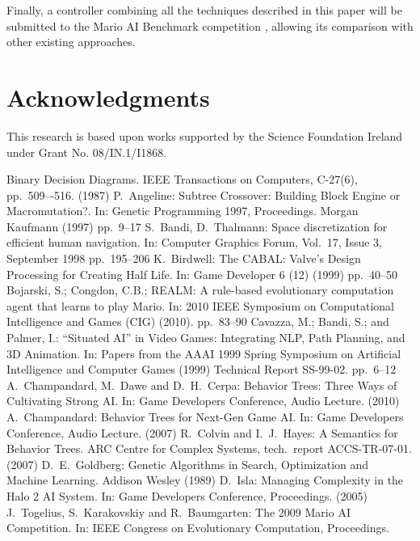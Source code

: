 \documentclass[conference]{IEEEtran}
\begin{document}
Finally, a controller combining all the techniques described in this paper will
be submitted to the Mario AI Benchmark competition \cite{JSR10}, allowing its
comparison with other existing approaches.

\section*{Acknowledgments}
This research is based upon works supported by the Science Foundation Ireland
under Grant No. 08/IN.1/I1868.


%
\begin{thebibliography}{11}
	Binary Decision Diagrams.
	IEEE Transactions on Computers, C-27(6), pp.~509–-516. (1987)
	P.~Angeline:
	Subtree Crossover: Building Block Engine or Macromutation?.
	In: Genetic Programming 1997, Proceedings.
	Morgan Kaufmann (1997)
	pp.~9--17
	S.~Bandi, D.~Thalmann:
	Space discretization for efficient human navigation.
	In: Computer Graphics Forum, Vol.~17, Issue 3, September 1998
	pp.~195--206
	K.~Birdwell:
	The CABAL: Valve's Design Processing for Creating Half Life.
	In: Game Developer 6 (12) (1999)
	pp.~40--50
	Bojarski, S.;   Congdon, C.B.;
	REALM: A rule-based evolutionary computation agent that learns to play Mario.
	In: 2010 IEEE Symposium on Computational Intelligence and Games (CIG) (2010).
	pp.~83--90
	Cavazza, M.; Bandi, S.; and Palmer, I.:
	“Situated AI” in Video Games: Integrating NLP, Path Planning, 
	and 3D Animation.
	In:  Papers from the AAAI 1999 Spring Symposium on Artificial 
	Intelligence and Computer Games (1999)
	Technical Report SS-99-02.
	pp.~6--12
	A.~Champandard, M.~Dawe and D.~H.~Cerpa:
	Behavior Trees: Three Ways of Cultivating Strong AI.
	In: Game Developers Conference, Audio Lecture. (2010)
	A.~Champandard:
	Behavior Trees for Next-Gen Game AI.
	In: Game Developers Conference, Audio Lecture. (2007)
	R.~Colvin and I.~J.~Hayes:
	A Semantics for Behavior Trees.
	ARC Centre for Complex Systems, tech.~report ACCS-TR-07-01. (2007)
	D.~E.~Goldberg:
	Genetic Algorithms in Search, Optimization and Machine Learning.
	Addison Wesley (1989)
	D.~Isla:
	Managing Complexity in the Halo 2 AI System.
	In: Game Developers Conference, Proceedings. (2005)
	J.~Togelius, S.~Karakovskiy and R.~Baumgarten:
	The 2009 Mario AI Competition.
	In: IEEE Congress on Evolutionary Computation, Proceedings.

\end{thebibliography}
\end{document}
